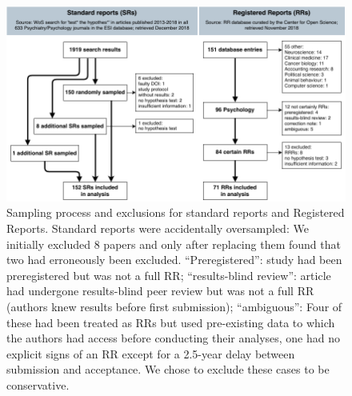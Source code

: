 \documentclass[british,,man,floatsintext]{apa6}
\begin{document}
\begin{figure}
\includegraphics[width=\textwidth]{Sampling_exclusions_and_resampling} \caption{Sampling process and exclusions for standard reports and Registered Reports. Standard reports were accidentally oversampled: We initially excluded 8 papers and only after replacing them found that two had erroneously been excluded. \enquote{Preregistered}: study had been preregistered but was not a full RR; \enquote{results-blind review}: article had undergone results-blind peer review but was not a full RR (authors knew results before first submission); \enquote{ambiguous}: Four of these had been treated as RRs but used pre-existing data to which the authors had access before conducting their analyses, one had no explicit signs of an RR except for a 2.5-year delay between submission and acceptance. We chose to exclude these cases to be conservative.}\label{fig:sampling}
\end{figure}
\end{document}

